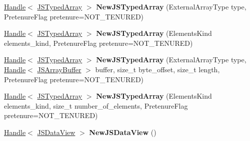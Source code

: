 \begin{DoxyCompactItemize}
\item 
\hyperlink{classv8_1_1internal_1_1_handle}{Handle}$<$ \hyperlink{classv8_1_1internal_1_1_j_s_typed_array}{J\+S\+Typed\+Array} $>$ {\bfseries New\+J\+S\+Typed\+Array} (External\+Array\+Type type, Pretenure\+Flag pretenure=N\+O\+T\+\_\+\+T\+E\+N\+U\+R\+ED)\hypertarget{classv8_1_1internal_1_1_factory_a151ae6add71235e86137e97819da435e}{}\label{classv8_1_1internal_1_1_factory_a151ae6add71235e86137e97819da435e}

\item 
\hyperlink{classv8_1_1internal_1_1_handle}{Handle}$<$ \hyperlink{classv8_1_1internal_1_1_j_s_typed_array}{J\+S\+Typed\+Array} $>$ {\bfseries New\+J\+S\+Typed\+Array} (Elements\+Kind elements\+\_\+kind, Pretenure\+Flag pretenure=N\+O\+T\+\_\+\+T\+E\+N\+U\+R\+ED)\hypertarget{classv8_1_1internal_1_1_factory_a6a04ec0bf00ca88aeb62be7200bdbf29}{}\label{classv8_1_1internal_1_1_factory_a6a04ec0bf00ca88aeb62be7200bdbf29}

\item 
\hyperlink{classv8_1_1internal_1_1_handle}{Handle}$<$ \hyperlink{classv8_1_1internal_1_1_j_s_typed_array}{J\+S\+Typed\+Array} $>$ {\bfseries New\+J\+S\+Typed\+Array} (External\+Array\+Type type, \hyperlink{classv8_1_1internal_1_1_handle}{Handle}$<$ \hyperlink{classv8_1_1internal_1_1_j_s_array_buffer}{J\+S\+Array\+Buffer} $>$ buffer, size\+\_\+t byte\+\_\+offset, size\+\_\+t length, Pretenure\+Flag pretenure=N\+O\+T\+\_\+\+T\+E\+N\+U\+R\+ED)\hypertarget{classv8_1_1internal_1_1_factory_aba0d2eca3d7a5b616d97cbb8bfa800cb}{}\label{classv8_1_1internal_1_1_factory_aba0d2eca3d7a5b616d97cbb8bfa800cb}

\item 
\hyperlink{classv8_1_1internal_1_1_handle}{Handle}$<$ \hyperlink{classv8_1_1internal_1_1_j_s_typed_array}{J\+S\+Typed\+Array} $>$ {\bfseries New\+J\+S\+Typed\+Array} (Elements\+Kind elements\+\_\+kind, size\+\_\+t number\+\_\+of\+\_\+elements, Pretenure\+Flag pretenure=N\+O\+T\+\_\+\+T\+E\+N\+U\+R\+ED)\hypertarget{classv8_1_1internal_1_1_factory_ac0407f494897bae5f8b2652eb267cc62}{}\label{classv8_1_1internal_1_1_factory_ac0407f494897bae5f8b2652eb267cc62}

\item 
\hyperlink{classv8_1_1internal_1_1_handle}{Handle}$<$ \hyperlink{classv8_1_1internal_1_1_j_s_data_view}{J\+S\+Data\+View} $>$ {\bfseries New\+J\+S\+Data\+View} ()\hypertarget{classv8_1_1internal_1_1_factory_a24dc498ec96251b4cb7ce183f5a0121d}{}\label{classv8_1_1internal_1_1_factory_a24dc498ec96251b4cb7ce183f5a0121d}


\end{DoxyCompactItemize}
